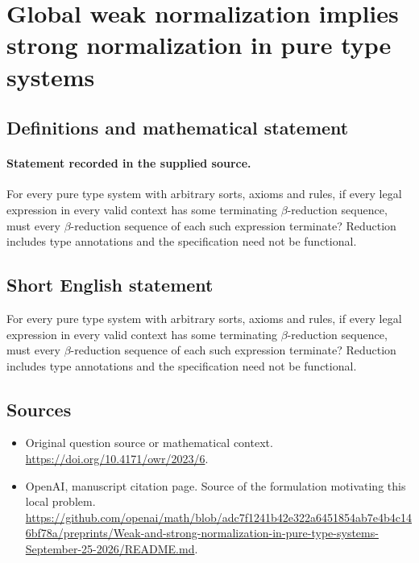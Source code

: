 \documentclass[11pt]{article}
\begin{document}
\section*{Global weak normalization implies strong normalization in pure type systems}\label{statement}
\subsection{Definitions and mathematical statement}
\paragraph{Statement recorded in the supplied source.}
For every pure type system with arbitrary sorts, axioms and rules, if every legal expression in every valid context has some terminating $\beta$-reduction sequence, must every $\beta$-reduction sequence of each such expression terminate? Reduction includes type annotations and the specification need not be functional.
\subsection{Short English statement}
For every pure type system with arbitrary sorts, axioms and rules, if every legal expression in every valid context has some terminating $\beta$-reduction sequence, must every $\beta$-reduction sequence of each such expression terminate? Reduction includes type annotations and the specification need not be functional.
\subsection{Sources}
\begin{itemize}
\item[S1] Original question source or mathematical context.
\url{https://doi.org/10.4171/owr/2023/6}.
\item[S2] OpenAI, manuscript citation page. Source of the formulation motivating this local problem.
\url{https://github.com/openai/math/blob/adc7f1241b42e322a6451854ab7e4b4c146bf78a/preprints/Weak-and-strong-normalization-in-pure-type-systems-September-25-2026/README.md}.
\end{itemize}
\end{document}
